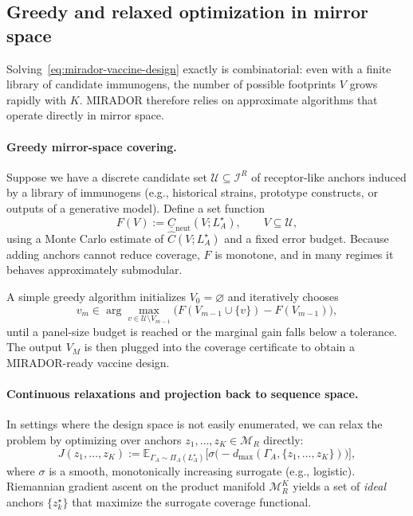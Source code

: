 \documentclass[11pt]{article}
\begin{document}
\subsection{Greedy and relaxed optimization in mirror space}
\label{subsec:greedy-relaxed}

Solving~\eqref{eq:mirador-vaccine-design} exactly is combinatorial: even with a finite library of
candidate immunogens, the number of possible footprints $V$ grows rapidly with $K$. MIRADOR
therefore relies on approximate algorithms that operate directly in mirror space.

\paragraph{Greedy mirror-space covering.}
Suppose we have a discrete candidate set
$\mathcal{U} \subseteq \mathcal{I}^R$ of receptor-like anchors induced by a library of immunogens
(e.g., historical strains, prototype constructs, or outputs of a generative model). Define a set
function
\[
  F(V) := \underline{C}_{\mathrm{neut}}(V;L_A^\star),
  \qquad V \subseteq \mathcal{U},
\]
using a Monte Carlo estimate of $\widehat{C}(V;L_A^\star)$ and a fixed error budget. Because adding
anchors cannot reduce coverage, $F$ is monotone, and in many regimes it behaves approximately
submodular.

A simple greedy algorithm initializes $V_0 = \varnothing$ and iteratively chooses
\[
  v_{m} \in \arg\max_{v \in \mathcal{U} \setminus V_{m-1}}
               \bigl( F(V_{m-1} \cup \{v\}) - F(V_{m-1}) \bigr),
\]
until a panel-size budget is reached or the marginal gain falls below a tolerance. The output
$V_M$ is then plugged into the coverage certificate to obtain a MIRADOR-ready vaccine design.

\paragraph{Continuous relaxations and projection back to sequence space.}
In settings where the design space is not easily enumerated, we can relax the problem by
optimizing over anchors $z_1,\dots,z_K \in \mathcal{M}_R$ directly:
\begin{equation}
\label{eq:relaxed-objective}
  J(z_1,\dots,z_K)
  := \mathbb{E}_{\Gamma_A \sim \Pi_A(L_A^\star)}
      \bigl[ \sigma\bigl(-d_{\max}(\Gamma_A,\{z_1,\dots,z_K\})\bigr) \bigr],
\end{equation}
where $\sigma$ is a smooth, monotonically increasing surrogate (e.g., logistic). Riemannian
gradient ascent on the product manifold $\mathcal{M}_R^K$ yields a set of \emph{ideal} anchors
$\{z_k^\star\}$ that maximize the surrogate coverage functional.
\end{document}
